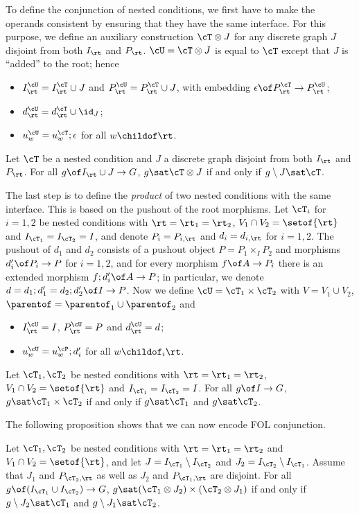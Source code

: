 To define the conjunction of nested conditions, we first have to make the operands consistent by ensuring that they have the same interface. For this purpose, we define an auxiliary construction $\cT\otimes J$ for any discrete graph $J$ disjoint from both $I_{\rt}$ and $P_{\rt}$. $\cU=\cT\otimes J$ is equal to $\cT$ except that $J$ is ``added'' to the root; hence
\begin{itemize}
\item $I^\cU_{\rt}=I^\cT_{\rt}\cup J$ and $P^\cU_{\rt}=P^\cT_{\rt}\cup J$, with embedding $\epsilon\of P^\cT_{\rt}\to P^\cU_{\rt}$;
\item $d^\cU_{\rt}=d^\cT_{\rt}\cup \id_J$;
\item $u^\cU_w=u^\cT_w;\epsilon$ for all $w\childof \rt$. 
\end{itemize}


\begin{proposition}
Let $\cT$ be a nested condition and $J$ a discrete graph disjoint from both $I_{\rt}$ and $P_{\rt}$. For all $g\of I_{\rt}\cup J\to G$, $g\sat \cT\otimes J$ if and only if $g\setminus J\sat\cT$.
\end{proposition}

The last step is to define the \emph{product} of two nested conditions with the same interface. This is based on the pushout of the root morphisms. Let $\cT_i$ for $i=1,2$ be nested conditions with $\rt=\rt_1=\rt_2$, $V_1\cap V_2=\setof{\rt}$ and $I_{\cT_1}=I_{\cT_2}=I$, and denote $P_i=P_{i,\rt}$ and $d_i=d_{i,\rt}$ for $i=1,2$. The pushout of $d_1$ and $d_2$ consists of a pushout object $P=P_1\times_I P_2$ and morphisms $d'_i\of P_i\to P$ for $i=1,2$, and for every morphism $f\of A\to P_i$ there is an extended morphism $f;d'_i\of A\to P$; in particular, we denote $d=d_1;d'_1=d_2;d'_2\of I\to P$. Now we define $\cU=\cT_1\times \cT_2$ with $V=V_1\cup V_2$, ${\parentof}= {\parentof}_1\cup {\parentof}_2$ and
%
\begin{itemize}
\item $I^\cU_{\rt}=I$, $P^\cU_{\rt}=P$ and $d^\cU_{\rt}=d$;
\item $u^\cU_w=u^\cP_w;d'_i$ for all $w\childof_i \rt$.
\end{itemize}

\begin{proposition}
Let $\cT_1,\cT_2$ be nested conditions with $\rt=\rt_1=\rt_2$, $V_1\cap V_2=\setof{\rt}$ and $I_{\cT_1}=I_{\cT_2}=I$. For all $g\of I\to G$, $g\sat \cT_1\times \cT_2$ if and only if $g\sat\cT_1$ and $g\sat \cT_2$.
\end{proposition}
%
The following proposition shows that we can now encode FOL conjunction.

\begin{proposition}
Let $\cT_1,\cT_2$ be nested conditions with $\rt=\rt_1=\rt_2$ and $V_1\cap V_2=\setof{\rt}$, and let $J=I_{\cT_1}\setminus I_{\cT_2}$ and $J_2=I_{\cT_2}\setminus I_{\cT_1}$. Assume that $J_1$ and $P_{\cT_2,\rt}$ as well as $J_2$ and $P_{\cT_1,\rt}$ are disjoint. For all $g\of (I_{\cT_1}\cup I_{\cT_2})\to G$, $g\sat (\cT_1\otimes J_2)\times (\cT_2\otimes J_1)$ if and only if $g\setminus J_2\sat\cT_1$ and $g\setminus J_1\sat \cT_2$.
\end{proposition}
